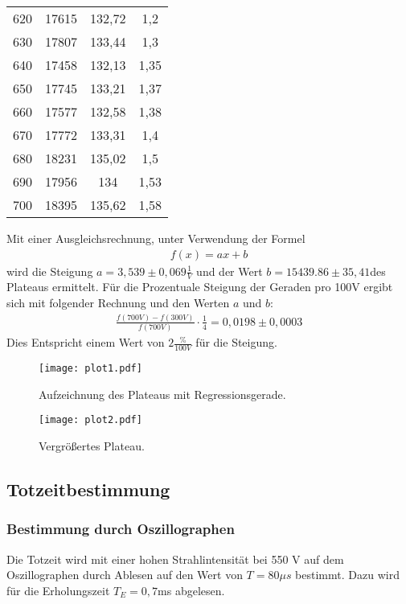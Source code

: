 \begin{table}
\begin{tabular}{c c c c}
  620 & 17615 & 132,72 & 1,2 \\
  630 & 17807 & 133,44 & 1,3 \\
  640 & 17458 & 132,13 & 1,35 \\
  650 & 17745 & 133,21 & 1,37 \\
  660 & 17577 & 132,58 & 1,38 \\
  670 & 17772 & 133,31 & 1,4 \\
  680 & 18231 & 135,02 & 1,5 \\
  690 & 17956 & 134 & 1,53 \\
  700 & 18395 & 135,62 & 1,58 \\
  \bottomrule
\end{tabular}
\end{table}
\FloatBarrier

Mit einer Ausgleichsrechnung, unter Verwendung der Formel
\begin{align*}
  f(x)=ax+b
\end{align*}
wird die Steigung $a = 3,539 \pm 0,069 \frac{1}{V}$ und der Wert $b = 15439.86 \pm 35,41 $des Plateaus ermittelt.
Für die Prozentuale Steigung der Geraden pro 100V ergibt sich mit folgender Rechnung und den Werten $a$ und $b$:
\begin{align*}
  \frac{f(700V) - f(300V)}{f(700V)} \cdot \frac{1}{4} = 0,0198 \pm 0,0003
\end{align*}
Dies Entspricht einem Wert von $2 \frac{\%}{100V}$ für die Steigung.

\begin{figure}
  \centering
  \texttt{[image: plot1.pdf]}
  \caption{Aufzeichnung des Plateaus mit Regressionsgerade.}
  \label{fig:plot1}
\end{figure}
\FloatBarrier
\begin{figure}
  \centering
  \texttt{[image: plot2.pdf]}
  \caption{Vergrößertes Plateau.}
  \label{fig:plot2}
\end{figure}
\FloatBarrier

\subsection{Totzeitbestimmung}
\label{sec:totzeit}

\subsubsection{Bestimmung durch Oszillographen}
\label{sec:oszi}

Die Totzeit wird mit einer hohen Strahlintensität bei 550 V auf dem Oszillographen durch Ablesen auf den Wert von $T = 80 \mu s$ bestimmt.
Dazu wird für die Erholungszeit $T_E=0,7$ms abgelesen.

